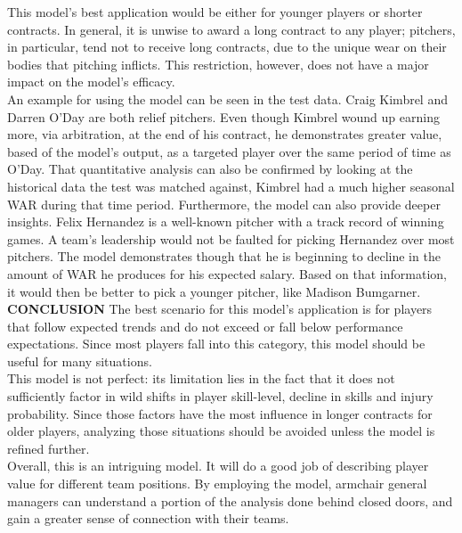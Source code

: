 \documentclass[12pt]{article}
\begin{document}
This model's best application would be either for younger players or shorter contracts.  In general, it is unwise to award a long contract to any player; pitchers, in particular, tend not to receive long contracts, due to the unique wear on their bodies that pitching inflicts.  This restriction, however, does not have a major impact on the model's efficacy. \\

An example for using the model can be seen in the test data.  Craig Kimbrel and Darren O'Day are both relief pitchers.  Even though Kimbrel wound up earning more, via arbitration, at the end of his contract, he demonstrates greater value, based of the model's output, as a targeted player over the same period of time as O'Day.   That quantitative analysis can also be confirmed by looking at the historical data the test was matched against, Kimbrel had a much higher seasonal WAR during that time period.  Furthermore, the model can also provide deeper insights.  Felix Hernandez is a well-known pitcher with a track record of winning games.  A team's leadership would not be faulted for picking Hernandez over most pitchers.  The model demonstrates though that he is beginning to decline in the amount of WAR he produces for his expected salary.  Based on that information, it would then be better to pick a younger pitcher, like Madison Bumgarner. \\
\vskip 2pt
\textbf{CONCLUSION}
\vskip 2pt
The best scenario for this model's application is for players that follow expected trends and do not exceed or fall below performance expectations. Since most players fall into this category, this model should be useful for many situations. \\

This model is not perfect: its limitation lies in the fact that it does not sufficiently factor in wild shifts in player skill-level, decline in skills and injury probability.  Since those factors have the most influence in longer contracts for older players, analyzing those situations should be avoided unless the model is refined further. \\

Overall, this is an intriguing model. It will do a good job of describing player value for different team positions.  By employing the model, armchair general managers can understand a portion of the analysis done behind closed doors, and gain a greater sense of connection with their teams. \\
\pagebreak
\end{document}
